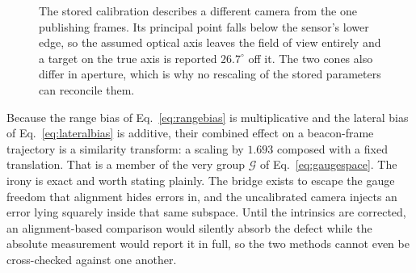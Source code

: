 \begin{figure}[htbp]
\centering
{}
\caption[Intrinsics mismatch]{The stored calibration describes a different
camera from the one publishing frames. Its principal point falls below the
sensor's lower edge, so the assumed optical axis leaves the field of view
entirely and a target on the true axis is reported $26.7^\circ$ off it. The
two cones also differ in aperture, which is why no rescaling of the stored
parameters can reconcile them.}
\label{fig:july30cones}
\end{figure}

\noindent Because the range bias of Eq.~\ref{eq:rangebias} is multiplicative
and the lateral bias of Eq.~\ref{eq:lateralbias} is additive, their combined
effect on a beacon-frame trajectory is a similarity transform: a scaling by
$1.693$ composed with a fixed translation. That is a member of the very group
$\mathcal{G}$ of Eq.~\ref{eq:gaugespace}. The irony is exact and worth
stating plainly. The bridge exists to escape the gauge freedom that alignment
hides errors in, and the uncalibrated camera injects an error lying squarely
inside that same subspace. Until the intrinsics are corrected, an
alignment-based comparison would silently absorb the defect while the absolute
measurement would report it in full, so the two methods cannot even be
cross-checked against one another.

